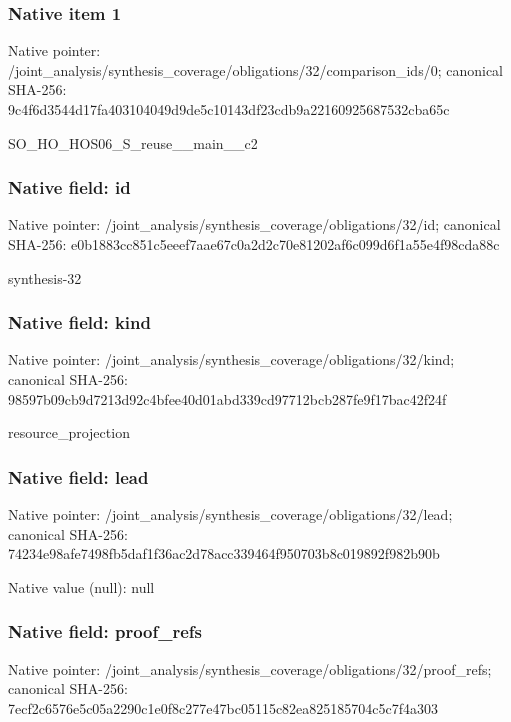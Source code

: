 \documentclass[10pt,a4paper]{article}
\begin{document}
\subsubsection{Native item 1}
Native pointer: /joint\_\allowbreak{}analysis/synthesis\_\allowbreak{}coverage/obligations/32/comparison\_\allowbreak{}ids/0; canonical SHA-256: 9c4f6d3544d17fa403104049d9de5c10143df23cdb9a22160925687532cba65c

\begingroup\raggedright\sloppy SO\_\allowbreak{}HO\_\allowbreak{}HOS06\_\allowbreak{}S\_\allowbreak{}reuse\_\allowbreak{}\_\allowbreak{}main\_\allowbreak{}\_\allowbreak{}c2\par\endgroup

\subsubsection{Native field: id}
Native pointer: /joint\_\allowbreak{}analysis/synthesis\_\allowbreak{}coverage/obligations/32/id; canonical SHA-256: e0b1883cc851c5eeef7aae67c0a2d2c70e81202af6c099d6f1a55e4f98cda88c

\begingroup\raggedright\sloppy synthesis-32\par\endgroup

\subsubsection{Native field: kind}
Native pointer: /joint\_\allowbreak{}analysis/synthesis\_\allowbreak{}coverage/obligations/32/kind; canonical SHA-256: 98597b09cb9d7213d92c4bfee40d01abd339cd97712bcb287fe9f17bac42f24f

\begingroup\raggedright\sloppy resource\_\allowbreak{}projection\par\endgroup

\subsubsection{Native field: lead}
Native pointer: /joint\_\allowbreak{}analysis/synthesis\_\allowbreak{}coverage/obligations/32/lead; canonical SHA-256: 74234e98afe7498fb5daf1f36ac2d78acc339464f950703b8c019892f982b90b

Native value (null): null

\subsubsection{Native field: proof\_\allowbreak{}refs}
Native pointer: /joint\_\allowbreak{}analysis/synthesis\_\allowbreak{}coverage/obligations/32/proof\_\allowbreak{}refs; canonical SHA-256: 7ecf2c6576e5c05a2290c1e0f8c277e47bc05115c82ea825185704c5c7f4a303
\end{document}
